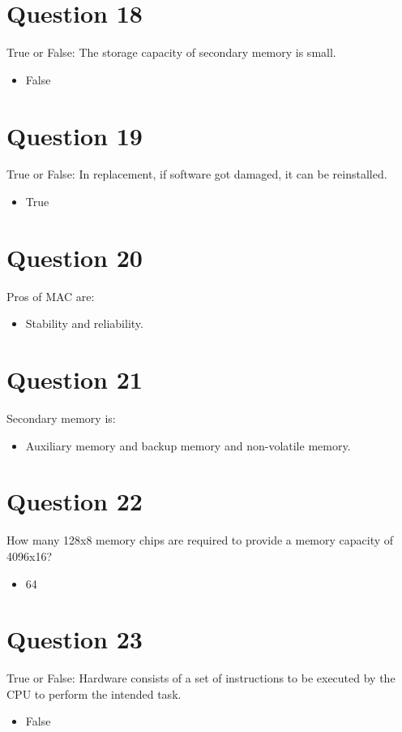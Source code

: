 \documentclass{article}
\begin{document}
\section*{Question 18}
True or False: The storage capacity of secondary memory is small.
\begin{itemize}[label=\alph*.]
    \item False
\end{itemize}

\section*{Question 19}
True or False: In replacement, if software got damaged, it can be reinstalled.
\begin{itemize}[label=\alph*.]
    \item True
\end{itemize}

\section*{Question 20}
Pros of MAC are:
\begin{itemize}[label=\alph*.]
    \item Stability and reliability.
\end{itemize}

\section*{Question 21}
Secondary memory is:
\begin{itemize}[label=\alph*.]
    \item Auxiliary memory and backup memory and non-volatile memory.
\end{itemize}

\section*{Question 22}
How many 128x8 memory chips are required to provide a memory capacity of 4096x16?
\begin{itemize}[label=\alph*.]
    \item 64
\end{itemize}

\section*{Question 23}
True or False: Hardware consists of a set of instructions to be executed by the CPU to perform the intended task.
\begin{itemize}[label=\alph*.]
    \item False
\end{itemize}
\end{document}
